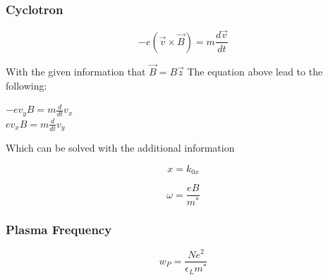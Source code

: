 \subsubsection*{Cyclotron}
\begin{equation}
    -e (\vec{v} \times \vec{B}) =  m \frac{d\vec{v}}{dt}
\end{equation}

With the given information that $\vec{B} = B\vec{z}$
The equation above lead to the following:

$-e v_y B = m \frac{d}{dt}v_x$\\
$e v_x B = m \frac{d}{dt}v_y$

Which can be solved with the additional information

$$x = k_{0x}$$

$$\omega = \frac{eB}{m^*}$$

\subsubsection*{Plasma Frequency}

\begin{equation}
    w_P = \frac{Ne^2}{\epsilon_L m^*}
\end{equation}